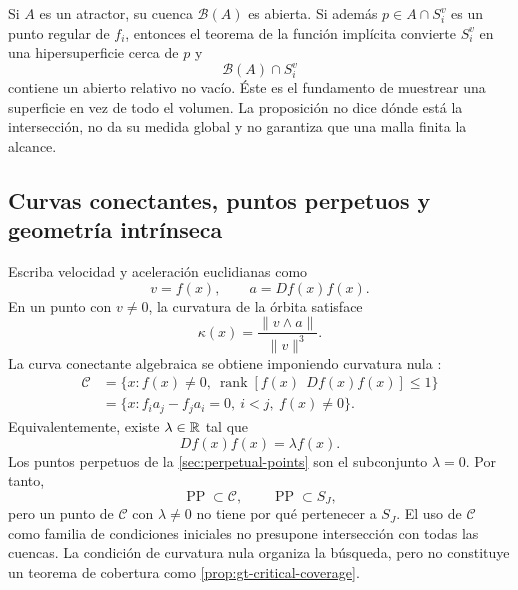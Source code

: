 Si $A$ es un atractor, su cuenca $\mathcal B(A)$ es abierta. Si además
$p\in A\cap S_i^v$ es un punto regular de $f_i$, entonces el teorema de la
función implícita convierte $S_i^v$ en una hipersuperficie cerca de $p$ y
\begin{equation}
 \mathcal B(A)\cap S_i^v
 \label{gt:eq:relative-open-basin}
\end{equation}
contiene un abierto relativo no vacío. Éste es el fundamento de muestrear una
superficie en vez de todo el volumen. La proposición no dice dónde está la
intersección, no da su medida global y no garantiza que una malla finita la
alcance.

\subsection{Curvas conectantes, puntos perpetuos y geometría intrínseca}
\label{subsec:gt-connecting}

Escriba velocidad y aceleración euclidianas como
\begin{equation}
 v=f(x),\qquad a=Df(x)f(x).
 \label{gt:eq:va}
\end{equation}
En un punto con $v\ne0$, la curvatura de la órbita satisface
\begin{equation}
 \kappa(x)=\frac{\lVert v\wedge a\rVert}{\lVert v\rVert^3}.
 \label{gt:eq:curvature}
\end{equation}
La curva conectante algebraica se obtiene imponiendo curvatura nula
\cite{GilmoreEtAl2010Connecting,GuanXie2021Connecting}:
\begin{align}
 \mathcal C
 &=\{x:f(x)\ne0,\ \operatorname{rank}[f(x)\ \ Df(x)f(x)]\le1\}
 \label{gt:eq:connecting-rank}\\
 &=\{x:f_i a_j-f_j a_i=0,\ i<j,\ f(x)\ne0\}.
 \label{gt:eq:connecting-minors}
\end{align}
Equivalentemente, existe $\lambda\in\mathbb{R}$ tal que
\begin{equation}
 Df(x)f(x)=\lambda f(x).
 \label{gt:eq:connecting-eigen}
\end{equation}
Los puntos perpetuos de la \cref{sec:perpetual-points} son el subconjunto
$\lambda=0$. Por tanto,
\begin{equation}
 \operatorname{PP}\subset\mathcal C,
 \qquad
 \operatorname{PP}\subset S_J,
 \label{gt:eq:pp-inclusions}
\end{equation}
pero un punto de $\mathcal C$ con $\lambda\ne0$ no tiene por qué pertenecer a
$S_J$. El uso de $\mathcal C$ como familia de condiciones iniciales no
presupone intersección con todas las cuencas. La condición de curvatura nula
organiza la búsqueda, pero no constituye un teorema de cobertura como
\cref{prop:gt-critical-coverage}.

